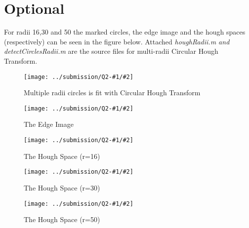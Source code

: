 \documentclass{article}
\newcommand{\listFigure}[4]{
\begin{figure}[H]
	\texttt{[image: ../submission/Q2-\#1/\#2]}
	\caption{#3\label{fig:#4}}
\end{figure}		
}
\begin{document}
	\section{Optional}
	For radii 16,30 and 50 the marked circles, the edge image and the hough spaces
	(respectively) can be seen in the figure below. Attached \textit{houghRadii.m
	and detectCirclesRadii.m} are the source files for multi-radii Circular Hough
	Transform.
	\listFigure{2}{Q2-2-Extra-circles-radius-multiple-Grad-0--n-3-jupiter.png}{Multiple radii circles is fit with Circular Hough Transform}{circleMulti}
	 
	\listFigure{2}{Q2-2-Extra-edges-radius-multiple-Grad-0--n-3-jupiter.png}{The
	Edge Image}{edgeMulti}
	
	\listFigure{2}{Q2-2-Extra-houghSpace-radius-16-Grad-0--n-3-jupiter.png}{The
	Hough Space (r=16)}{houghMulti16}

	\listFigure{2}{Q2-2-Extra-houghSpace-radius-30-Grad-0--n-3-jupiter.png}{The
	Hough Space (r=30)}{houghMulti30}

	\listFigure{2}{Q2-2-Extra-houghSpace-radius-50-Grad-0--n-3-jupiter.png}{The
	Hough Space (r=50)}{houghMulti50}	
\end{document}
